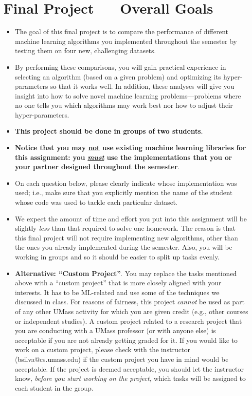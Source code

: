 \documentclass[letterpaper]{article}
\begin{document}
\newpage

\vspace{1cm}
\section{Final Project --- Overall Goals}

\begin{itemize}
	\item The goal of this final project is to compare the performance of different machine learning algorithms you implemented throughout the semester by testing them on four new, challenging datasets.
	\item By performing these comparisons, you will gain practical experience in selecting an algorithm (based on a given problem) and optimizing its hyper-parameters so that it works well. In addition, these analyses will give you insight into how to solve novel machine learning problems---problems where no one tells you which algorithms may work best nor how to adjust their hyper-parameters.
	\item \textbf{This project should be done in groups of two students}.
	\item \textbf{Notice that you may \ul{not} use existing machine learning libraries for this assignment: \textcolor{dark-red}{you \underline{\textit{must}} use the implementations that you or your partner designed throughout the semester}}.
	\item On each question below, please clearly indicate whose implementation was used; i.e., make sure that you explicitly mention the name of the student whose code was used to tackle each particular dataset.
	\item We expect the amount of time and effort you put into this assignment will be slightly \textit{less} than that required to solve one homework. The reason is that this final project will not require implementing new algorithms, other than the ones you already implemented during the semester. Also, you will be working in groups and so it should be easier to split up tasks evenly.
	      \vspace{0.5cm}
	\item \textcolor{dark-red}{\textbf{Alternative: ``Custom Project''}}. You may replace the tasks mentioned above with a ``custom project'' that is more closely aligned with your interests. It has to be ML-related and use some of the techniques we discussed in class. For reasons of fairness, this project \textit{cannot} be used as part of any other UMass activity for which you are given credit (e.g., other courses or independent studies). A custom project related to a research project that you are conducting with a UMass professor (or with anyone else) is acceptable if you are not already getting graded for it. If you would like to work on a custom project, please check with the instructor (bsilva@cs.umass.edu) if the custom project you have in mind would be acceptable. If the project is deemed acceptable, you should let the instructor know, \textit{before you start working on the project}, which tasks will be assigned to each student in the group.

\end{itemize}
\end{document}
